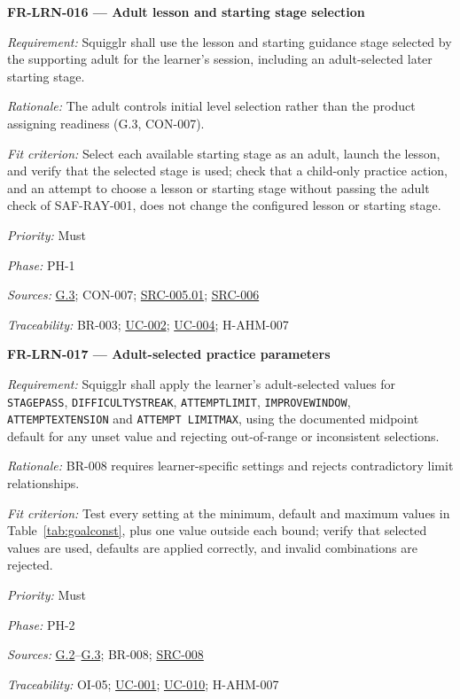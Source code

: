 \documentclass[12pt]{article}
\renewcommand{\_}{\textunderscore\allowbreak}%
\newcommand{\goalref}[1]{\hyperref[goal:#1]{G.#1}}
\newcommand{\ucref}[1]{\hyperref[uc:#1]{\mbox{UC-#1}}}
\newenvironment{srsrequirement}[2]{%
  \par\medskip\noindent\phantomsection\label{req:#1}%
  \textbf{#1 --- #2}\par\nobreak\smallskip }{\par\medskip}
\newcommand{\reqfield}[2]{\noindent\textit{#1:} #2\par}
\newcommand{\reqshall}[1]{\reqfield{Requirement}{#1}}
\newcommand{\reqrationale}[1]{\reqfield{Rationale}{#1}}
\newcommand{\reqfit}[1]{\reqfield{Fit criterion}{#1}}
\newcommand{\reqpriority}[1]{\reqfield{Priority}{#1}}
\newcommand{\reqphase}[1]{\reqfield{Phase}{#1}}
\newcommand{\reqsources}[1]{\reqfield{Sources}{#1}}
\newcommand{\reqtraces}[1]{\reqfield{Traceability}{#1}}
\newcommand{\srcref}[1]{\hyperref[src:#1]{SRC-#1}}
\providecommand{\ucref}[1]{\hyperref[uc:#1]{UC-#1}}
\begin{document}
\begin{srsrequirement}{FR-LRN-016}{Adult lesson and starting stage selection}
  \reqshall{Squigglr shall use the lesson and starting guidance stage selected
by the supporting adult for the learner's session, including an adult-selected
later starting stage.} \reqrationale{The adult controls initial level selection
rather than the product assigning readiness (G.3, CON-007).} \reqfit{Select each
available starting stage as an adult, launch the lesson, and verify that the
selected stage is used; check that a child-only practice action, and an attempt
to choose a lesson or starting stage without passing the adult check of
SAF-RAY-001, does not change the configured lesson or starting stage.}
  \reqpriority{Must}
  \reqphase{PH-1}
  \reqsources{\goalref{3}; CON-007; \hyperref[src:005.01]{SRC-005.01};
  \srcref{006}} \reqtraces{BR-003; \ucref{002}; \ucref{004}; H-AHM-007}
\end{srsrequirement}

\begin{srsrequirement}{FR-LRN-017}{Adult-selected practice parameters}
  \reqshall{Squigglr shall apply the learner's adult-selected values for
\texttt{STAGE\_\allowbreak PASS}, \texttt{DIFFICULTY\_\allowbreak STREAK},
\texttt{ATTEMPT\_\allowbreak LIMIT}, \texttt{IMPROVE\_\allowbreak WINDOW},
\texttt{ATTEMPT\_\allowbreak EXTENSION} and \texttt{ATTEMPT\_\allowbreak
LIMIT\_\allowbreak MAX}, using the documented midpoint default for any unset
value and rejecting out-of-range or inconsistent selections.}
\reqrationale{BR-008 requires learner-specific settings and rejects
contradictory limit relationships.} \reqfit{Test every setting at the minimum,
default and maximum values in Table~\ref{tab:goalconst}, plus one value outside
each bound; verify that selected values are used, defaults are applied
correctly, and invalid combinations are rejected.}
  \reqpriority{Must}
  \reqphase{PH-2}
  \reqsources{\goalref{2}--\goalref{3}; BR-008; \srcref{008}} \reqtraces{OI-05;
  \ucref{001}; \ucref{010}; H-AHM-007}
\end{srsrequirement}
\end{document}
